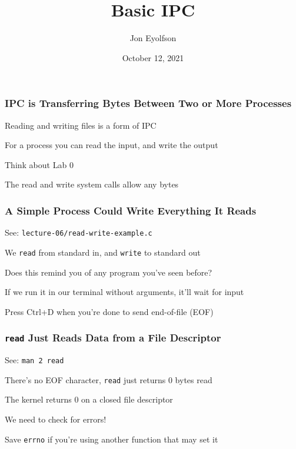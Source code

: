 

\title{Basic IPC}
\author{Jon Eyolfson}
\date{October 12, 2021}


  \begin{frame}
    \titlepage
  \end{frame}

  \begin{frame}
    \frametitle{IPC is Transferring Bytes Between Two or More Processes}

    Reading and writing files is a form of IPC

    \vspace{2em}

    For a process you can read the input, and write the output

    \hspace{2em} Think about Lab 0

    \vspace{2em}

    The read and write system calls allow any bytes
  \end{frame}

  \begin{frame}
    \frametitle{A Simple Process Could Write Everything It Reads}

    See: \texttt{lecture-06/read-write-example.c}

    \vspace{2em}

    We \texttt{read} from standard in, and \texttt{write} to standard out

    \hspace{2em} Does this remind you of any program you've seen before?

    \vspace{2em}

    If we run it in our terminal without arguments, it'll wait for input

    \hspace{2em} Press Ctrl+D when you're done to send end-of-file (EOF)
  \end{frame}

  \begin{frame}
    \frametitle{\texttt{read} Just Reads Data from a File Descriptor}

    See: \texttt{man 2 read}

    \vspace{2em}

    There's no EOF character, \texttt{read} just returns 0 bytes read

    \hspace{2em} The kernel returns 0 on a closed file descriptor

    \vspace{2em}

    We need to check for errors!

    \hspace{2em} Save \texttt{errno} if you're using another function that may
                 set it
  \end{frame}

